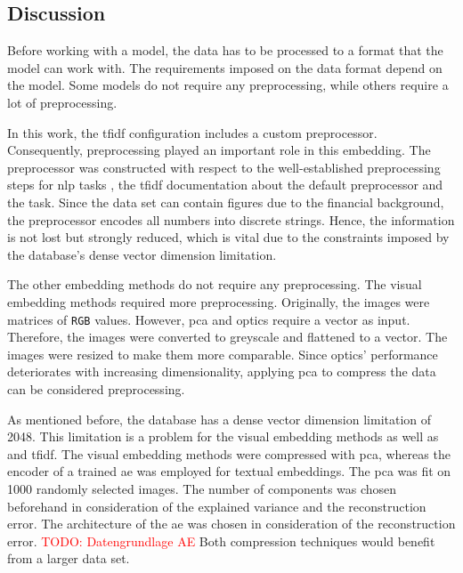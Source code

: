 \subsection{Discussion}\label{subsec:discussion}

Before working with a model, the data has to be processed to a format that the model can work with.
The requirements imposed on the data format depend on the model.
Some models do not require any preprocessing, while others require a lot of preprocessing.

In this work, the \ac{tfidf} configuration includes a custom preprocessor.
Consequently, preprocessing played an important role in this embedding.
The preprocessor was constructed with respect to the well-established preprocessing steps for \ac{nlp} tasks \cite{nlp-book2009},
the \ac{tfidf} documentation about the default preprocessor and the task.
Since the data set can contain figures due to the financial background, the preprocessor encodes all numbers into discrete strings.
Hence, the information is not lost but strongly reduced, which is vital due to the constraints imposed 
by the database's dense vector dimension limitation.

The other embedding methods do not require any preprocessing.
The visual embedding methods required more preprocessing.
Originally, the images were matrices of \texttt{RGB} values.
However, \ac{pca} and \ac{optics} require a vector as input.
Therefore, the images were converted to greyscale and flattened to a vector.
The images were resized to make them more comparable.
Since \ac{optics}' performance deteriorates with increasing dimensionality, 
applying \ac{pca} to compress the data can be considered preprocessing.


As mentioned before, the database has a dense vector dimension limitation of 2048.
This limitation is a problem for the visual embedding methods as well as \infersent{} and 
\ac{tfidf}.
The visual embedding methods were compressed with \ac{pca}, 
whereas the encoder of a trained \ac{ae} was employed for textual embeddings.
The \ac{pca} was fit on 1000 randomly selected images.
The number of components was chosen beforehand in consideration of the explained variance and the reconstruction error.
The architecture of the \ac{ae} was chosen in consideration of the reconstruction error.
\textcolor{red}{TODO: Datengrundlage AE}
Both compression techniques would benefit from a larger data set.


